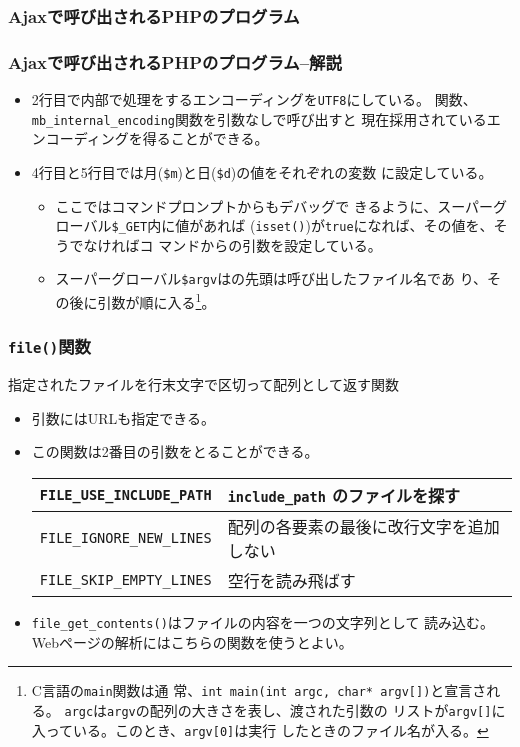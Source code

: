 \begin{frame}[containsverbatim]
\frametitle{Ajaxで呼び出されるPHPのプログラム}
\end{frame}
\begin{frame}[containsverbatim]
\frametitle{Ajaxで呼び出されるPHPのプログラム--解説}
\begin{itemize}
 \item 2行目で内部で処理をするエンコーディングを\texttt{UTF8}にしている。
       関数、\texttt{mb\_internal\_encoding}関数を引数なしで呼び出すと
       現在採用されているエンコーディングを得ることができる。
 \item 4行目と5行目では月(\verb+$m+)と日(\verb+$d+)の値をそれぞれの変数
       に設定している。
\begin{itemize}
 \item ここではコマンドプロンプトからもデバッグで
       きるように、スーパーグローバル\verb+$_GET+内に値があれば
       (\Verb+isset()+)が\Verb+true+になれば、その値を、そうでなければコ
       マンドからの引数を設定している。
 \item スーパーグローバル\verb+$argv+はの先頭は呼び出したファイル名であ
       り、その後に引数が順に入る\footnote{C言語の\texttt{main}関数は通
       常、\texttt{int main(int argc, char* argv[])}と宣言される。%
       \texttt{argc}は\texttt{argv}の配列の大きさを表し、渡された引数の
       リストが\texttt{argv[]}に入っている。このとき、\texttt{argv[0]}は実行
       したときのファイル名が入る。}。
\end{itemize}
\end{itemize}
\end{frame}
\begin{frame}[containsverbatim]
\frametitle{\texttt{file()}関数}
指定されたファイルを行末文字で区切って配列として返す関数\\
\begin{itemize}
\item 引数にはURLも指定できる。
\item この関数は2番目の引数をとることができる。
\begin{center}
 \begin{tabular}{|c|m{}|}\hline
 \Verb+FILE_USE_INCLUDE_PATH+ & \Verb+include_path+ のファイルを探す\\\hline
 \Verb+FILE_IGNORE_NEW_LINES+ & 配列の各要素の最後に改行文字を追加しない
      \\ \hline
  \Verb+FILE_SKIP_EMPTY_LINES+&空行を読み飛ばす \\ \hline
 \end{tabular}
\end{center}
 \item \verb+file_get_contents()+はファイルの内容を一つの文字列として
       読み込む。Webページの解析にはこちらの関数を使うとよい。
\end{itemize}
\end{frame}
